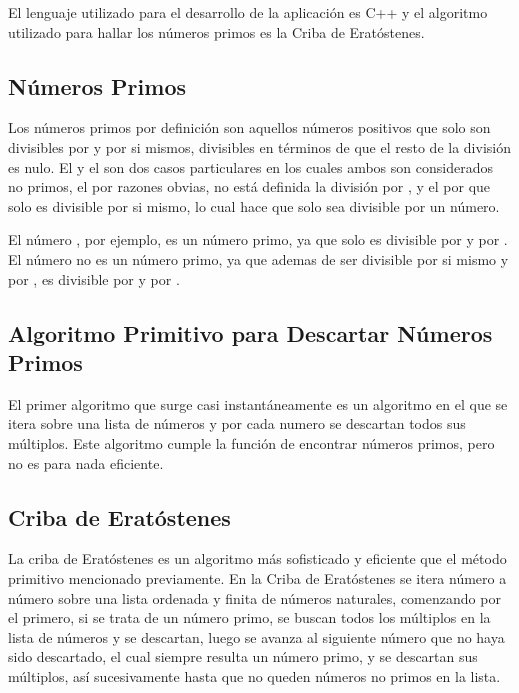 \documentclass[12pt]{article}
\begin{document}
El lenguaje utilizado para el desarrollo de la aplicación es C++ y el algoritmo
utilizado para hallar los números primos es la Criba de Eratóstenes.

\subsection{Números Primos}

Los números primos por definición son aquellos números positivos que solo son
divisibles por  y por si mismos, divisibles en términos de que el resto
de la división es nulo. El  y el  son dos casos particulares en
los cuales ambos son considerados no primos, el  por razones obvias, no
está definida la división por , y el  por que solo es divisible
por si mismo, lo cual hace que solo sea divisible por un número.

El número , por ejemplo, es un número primo, ya que solo es divisible
por  y por . El número  no es un número primo, ya que
ademas de ser divisible por si mismo y por , es divisible por  y
por .

\subsection{Algoritmo Primitivo para Descartar Números Primos}

El primer algoritmo que surge casi instantáneamente es un algoritmo en el que se
itera sobre una lista de números y por cada numero se descartan todos sus
múltiplos. Este algoritmo cumple la función de encontrar números primos, pero no
es para nada eficiente.

\subsection{Criba de Eratóstenes}

La criba de Eratóstenes es un algoritmo más sofisticado y eficiente que el
método primitivo mencionado previamente. En la Criba de Eratóstenes se itera
número a número sobre una lista ordenada y finita de números naturales,
comenzando por el primero, si se trata de un número primo, se buscan todos los
múltiplos en la lista de números y se descartan, luego se avanza al siguiente
número que no haya sido descartado, el cual siempre resulta un número primo, y
se descartan sus múltiplos, así sucesivamente hasta que no queden números no
primos en la lista. 
\end{document}
